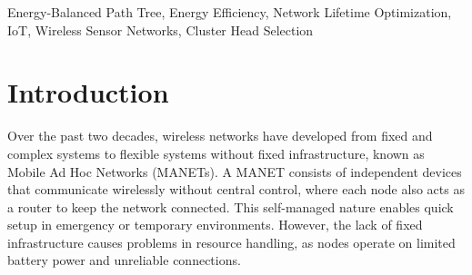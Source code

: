 \documentclass[conference]{IEEEtran}
\begin{document}
\begin{abstract}
 In modern Internet of Things (IoT) systems, Wireless Sensor Networks (WSNs) plays a critical role, but their lifetime is often limited by the Energy Hole problem. Nodes located near the Base Station (BS) handle most of the data forwarding and therefore drain their energy quickly, which can cause the network to break apart. Old routing protocols such as LEACH, HEED, and PEGASIS try to reduce this issue using random rotation or chain-based structures. However, these methods achieve only about 10–15\% of the network’s theoretical maximum lifetime. Vanguard-WSN, proposed framework replaces random decision-making with a utility-based deterministic approach. The framework includes two key innovations namely a Composite Utility Index (Ui) to select Cluster Heads based on remaining energy and network position, and an Energy-Balanced Path Tree (EBPT) with an adaptive load-balancing factor to prevent energy hotspots. Simulation results from 30 trials on a 100node network show that Vanguard-WSN is better than older systems. The First Node Death (FND) occurs at round 993.1, compared to LEACH (FND = 97.3). Vanguard achieves 92\% of the theoretical lifetime bound ($R^2=0.94$), maintains a Packet Success Ratio of 98.4\%, and operates within $O(NlogN)$ time complexity, making it suitable for low-power microcontrollers. These results show that Vanguard-WSN provides a highly efficient and practical solution for mission-critical WSN applications.
\end{abstract}

\begin{IEEEkeywords}
Energy-Balanced Path Tree, Energy Efficiency, Network Lifetime Optimization, IoT, Wireless Sensor Networks, Cluster Head Selection
\end{IEEEkeywords}

\section{Introduction}

Over the past two decades, wireless networks have developed from fixed and complex systems to flexible systems without fixed infrastructure, known as Mobile Ad Hoc Networks (MANETs). A MANET consists of independent devices that communicate wirelessly without central control, where each node also acts as a router to keep the network connected. This self-managed nature enables quick setup in emergency or temporary environments. However, the lack of fixed infrastructure causes problems in resource handling, as nodes operate on limited battery power and unreliable connections.
\end{document}
